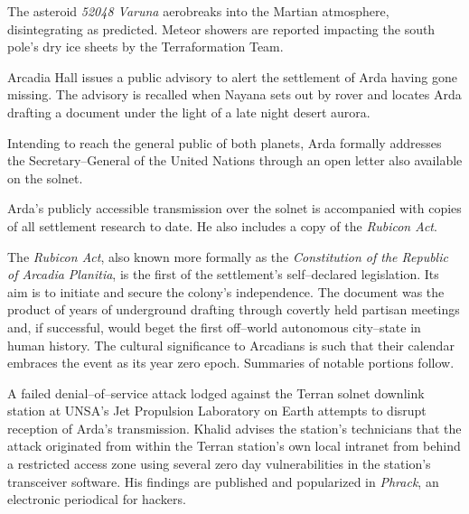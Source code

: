 The asteroid {\it 52048 Varuna} aerobreaks into the Martian atmosphere, disintegrating as predicted. Meteor showers are reported impacting the south pole's dry ice sheets by the Terraformation Team.
\StopTimelineDate

Arcadia Hall issues a public advisory to alert the settlement of Arda having gone missing. The advisory is recalled when Nayana sets out by rover and locates Arda drafting a document under the light of a late night desert aurora.
\StopTimelineDate


Intending to reach the general public of both planets, Arda formally addresses the Secretary--General of the United Nations through an open letter also available on the solnet.

\startTimelineCorrespondenceDocument
    
\stopTimelineCorrespondenceDocument

Arda's publicly accessible transmission over the solnet is accompanied with copies of all settlement research to date. He also includes a copy of the {\it Rubicon Act}. 

The {\it Rubicon Act}, also known more formally as the {\it Constitution of the Republic of Arcadia Planitia}, is the first of the settlement's self--declared legislation. Its aim is to initiate and secure the colony's independence. The document was the product of years of underground drafting through covertly held partisan meetings and, if successful, would beget the first off--world autonomous city--state in human history. The cultural significance to Arcadians is such that their calendar embraces the event as its year zero epoch. Summaries of notable portions follow.

\startTimelineGeneralDocument
    
\stopTimelineGeneralDocument

A failed denial--of--service attack lodged against the Terran solnet downlink station at UNSA's Jet Propulsion Laboratory on Earth attempts to disrupt reception of Arda's transmission. Khalid advises the station's technicians that the attack originated from within the Terran station's own local intranet from behind a restricted access zone using several zero day vulnerabilities in the station's transceiver software. His findings are published and popularized in {\it Phrack}, an electronic periodical for hackers.

